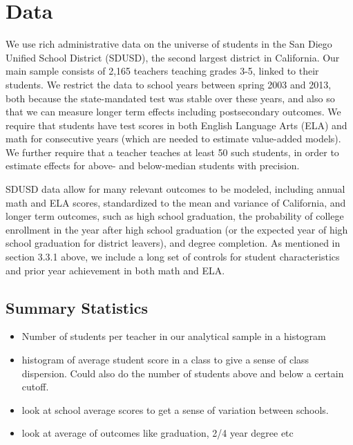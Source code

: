 \documentclass[12pt]{article}
\theoremstyle{definition}
\theoremstyle{definition}
\theoremstyle{definition}
\theoremstyle{definition}
\begin{document}
\section{Data}
\label{data_section}

We use rich administrative data on the universe of students in the San Diego Unified School District (SDUSD), the second largest district in California. Our main sample consists of 2,165 teachers teaching grades 3-5, linked to their students. We restrict the data to school years between spring 2003 and 2013, both because the state-mandated test was stable over these years, and also so that we can measure longer term effects including postsecondary outcomes. We require that students have test scores in both English Language Arts (ELA) and math for consecutive years (which are needed to estimate value-added models).  We further require that a teacher teaches at least 50 such students, in order to estimate effects for above- and below-median students with precision.  

SDUSD data allow for many relevant outcomes to be modeled, including annual math and ELA scores,  standardized to the mean and variance of California, and longer term outcomes, such as high school graduation, the probability of college enrollment in the year after high school graduation (or the expected year of high school graduation for district leavers), and degree completion. As mentioned in section 3.3.1 above, we include a long set of controls for student characteristics and prior year achievement in both math and ELA.  


    \subsection{Summary Statistics}
    \begin{itemize}
        \item Number of students per teacher in our analytical sample in a histogram 
        \item histogram of average student score in a class to give a sense of class dispersion. Could also do the number of students above and below a certain cutoff. 
        \item look at school average scores to get a sense of variation between schools. 
        \item look at average of outcomes like graduation, 2/4 year degree etc
    \end{itemize}
\end{document}
